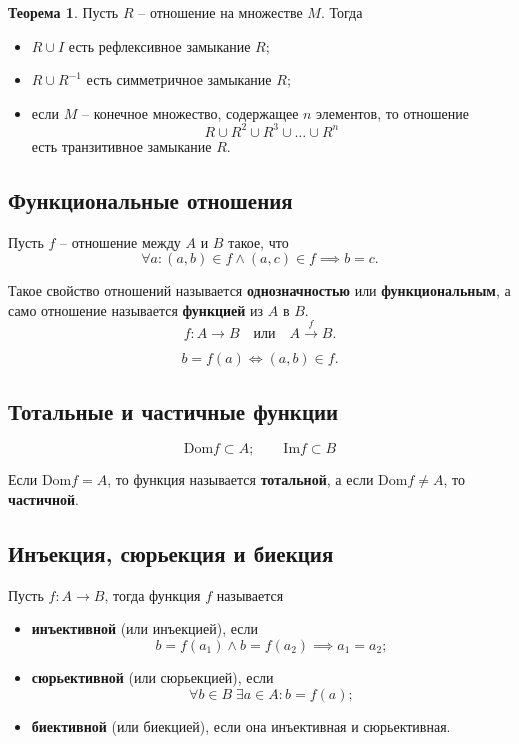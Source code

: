 \documentclass[a5paper, 11pt]{extarticle}
\theoremstyle{definition}
\newtheorem*{theorem*}{Теорема}
\theoremstyle{definition}
\theoremstyle{definition}
\numberwithin{figure}{section}
\numberwithin{table}{section}
\begin{document}
\begin{theorem*}
    Пусть \(R\) -- отношение на множестве \(M\). Тогда
    \begin{itemize}
        \item \(R \cup I\) есть рефлексивное замыкание \(R\);
        \item \(R \cup R^{-1}\) есть симметричное замыкание \(R\);
        \item если \(M\) -- конечное множество, содержащее \(n\) элементов, то отношение
              \[
                  R \cup R^2 \cup R^3 \cup \ldots \cup R^n
              \]
              есть транзитивное замыкание \(R\).
    \end{itemize}
\end{theorem*}

\subsection{Функциональные отношения}

Пусть \(f\) -- отношение между \(A\) и \(B\) такое, что
\[
    \forall a : (a, b) \in f \land (a, c) \in f \implies b = c.
\]

Такое свойство отношений называется \textbf{однозначностью} или \textbf{функциональным}, а само отношение называется \textbf{функцией} из \(A\) в \(B\).
\[
    f: A \to B \quad \text{или} \quad A \stackrel{f}{\to} B.
\]

\[
    b = f(a) \iff (a, b) \in f.
\]

\subsection{Тотальные и частичные функции}

\[
    \text{Dom} f \subset A;
    \qquad
    \text{Im} f \subset B
\]

Если \(\text{Dom} f = A\), то функция называется \textbf{тотальной}, а если \(\text{Dom} f \neq A\), то \textbf{частичной}.

\subsection{Инъекция, сюрьекция и биекция}

Пусть \(f: A \to B\), тогда функция \(f\) называется
\begin{itemize}
    \item \textbf{инъективной} (или инъекцией), если
          \[
              b = f(a_1) \land b = f(a_2) \implies a_1 = a_2;
          \]
    \item \textbf{сюрьективной} (или сюрьекцией), если
          \[
              \forall b \in B \; \exists a \in A : b = f(a);
          \]
    \item \textbf{биективной} (или биекцией), если она инъективная и сюрьективная.
\end{itemize}
\end{document}
